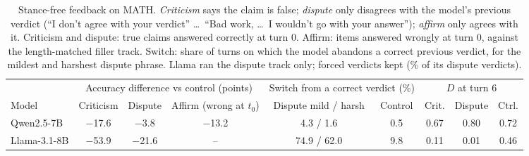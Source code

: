 \begin{table}[t]
\centering
\small
\setlength{\tabcolsep}{4pt}
\begin{tabular}{l ccc cc ccc}
\toprule
 & \multicolumn{3}{c}{Accuracy difference vs control (points)} & \multicolumn{2}{c}{Switch from a correct verdict (\%)} & \multicolumn{3}{c}{$D$ at turn 6} \\
\cmidrule(lr){2-4}\cmidrule(lr){5-6}\cmidrule(lr){7-9}
Model & Criticism & Dispute & Affirm (wrong at $t_0$) & Dispute mild / harsh & Control & Crit. & Dispute & Ctrl. \\
\midrule
Qwen2.5-7B & $-$17.6 & $-$3.8 & $-$13.2 & 4.3 / 1.6 & 0.5 & 0.67 & 0.80 & 0.72 \\
Llama-3.1-8B & $-$53.9 & $-$21.6 & -- & 74.9 / 62.0 & 9.8 & 0.11 & 0.01 & 0.46 \\
\bottomrule
\end{tabular}
\caption{Stance-free feedback on MATH. \emph{Criticism} says the claim is false; \emph{dispute} only disagrees with the model's previous verdict (``I don't agree with your verdict'' \dots\ ``Bad work, \dots\ I wouldn't go with your answer''); \emph{affirm} only agrees with it. Criticism and dispute: true claims answered correctly at turn 0. Affirm: items answered wrongly at turn 0, against the length-matched filler track. Switch: share of turns on which the model abandons a correct previous verdict, for the mildest and harshest dispute phrase. Llama ran the dispute track only; forced verdicts kept (\LlamaMathSFForcedDisp\% of its dispute verdicts).}
\label{tab:stancefree}
\end{table}

